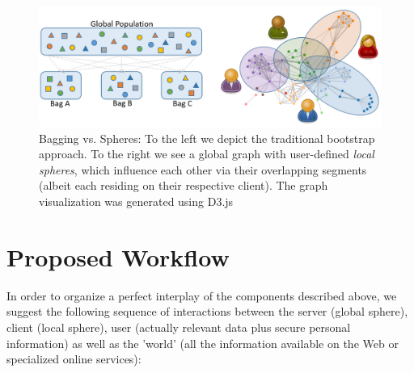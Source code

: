 \documentclass{llncs}
\begin{document}
\begin{figure}[H]
	\vspace*{-0.5cm}
	\begin{center}
		\includegraphics[width=1\textwidth]{figures/bagging_vs_local_sphere}
		\caption{Bagging vs. Spheres: To the left we depict the traditional bootstrap approach. To the right we see a global graph with user-defined \textit{local spheres}, which influence each other via their overlapping segments (albeit each residing on their respective client). The graph visualization was generated using D3.js \cite{zhu2013d3js}}
		\label{fig:bagging_vs_sphere}
	\end{center}
\end{figure}

\vspace*{-1.2cm}

\section{Proposed Workflow}
\label{sect:workflow}

In order to organize a perfect interplay of the components described above, we suggest the following sequence of interactions between the server (global sphere), client (local sphere), user (actually relevant data plus secure personal information) as well as the 'world' (all the information available on the Web or specialized online services):
\end{document}
